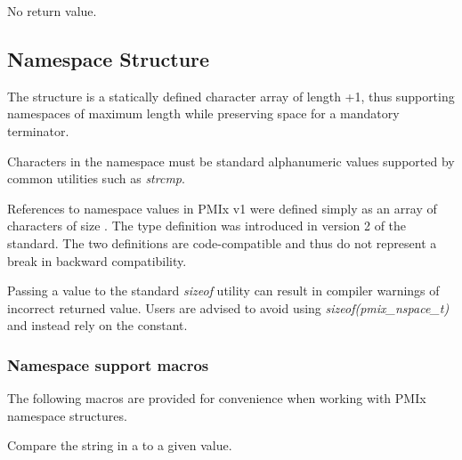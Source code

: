 No return value.

\subsection{Namespace Structure}

The  structure is a statically defined character array of length +1, thus supporting namespaces of maximum length  while preserving space for a mandatory  terminator.


Characters in the namespace must be standard alphanumeric values supported by common utilities such as \textit{strcmp}.

\adviceuserstart
References to namespace values in \ac{PMIx} v1 were defined simply as an array of characters of size . The  type definition was introduced in version 2 of the standard. The two definitions are code-compatible and thus do not represent a break in backward compatibility.

Passing a  value to the standard \textit{sizeof} utility can result in compiler warnings of incorrect returned value. Users are advised to avoid using \textit{sizeof(pmix_nspace_t)} and instead rely on the  constant.
\adviceuserend

\subsubsection{Namespace support macros}

The following macros are provided for convenience when working with \ac{PMIx} namespace structures.


Compare the string in a  to a given value.


\begin{arglist}
\end{arglist}

